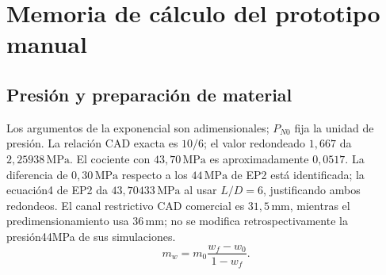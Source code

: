 \section{Memoria de cálculo del prototipo manual}
\subsection{Presión y preparación de material}
Los argumentos de la exponencial son adimensionales; $P_{N0}$ fija la unidad de presión.
La relación CAD exacta es $10/6$; el valor redondeado $1,667$ da $2,25938\,\mathrm{MPa}$.
El cociente con $43,70\,\mathrm{MPa}$ es aproximadamente $0,0517$.
La diferencia de $0,30\,\mathrm{MPa}$ respecto a los $44\,\mathrm{MPa}$ de EP2 está identificada;
la ecuación4 de EP2 da $43,70433\,\mathrm{MPa}$ al usar $L/D=6$, justificando ambos redondeos.
El canal restrictivo CAD comercial es $31,5\,\mathrm{mm}$, mientras el predimensionamiento usa
$36\,\mathrm{mm}$; no se modifica retrospectivamente la presión44MPa de sus simulaciones.
\begin{equation}m_w=m_0\frac{w_f-w_0}{1-w_f}.\end{equation}
